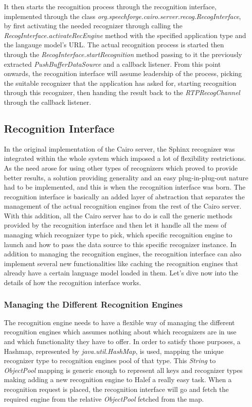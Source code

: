 It then starts the recognition process through the recognition interface, implemented through the class \textit{org.speechforge.cairo.server.recog.RecogInterface}, by first activating the needed recognizer through calling the \textit{RecogInterface.activateRecEngine} method with the specified application type and the langauge model's URL.
The actual recognition process is started then through the \textit{RecogInterface.startRecognition} method passing to it the previously extracted \textit{PushBufferDataSource} and a callback listener.
From this point onwards, the recognition interface will assume leadership of the process, picking the suitable recognizer that the application has asked for, starting recognition through this recognizer, then handing the result back to the \textit{RTPRecogChannel} through the callback listener.

\subsection{Recognition Interface}
In the original implementation of the Cairo server, the Sphinx recognizer was integrated within the whole system which imposed a lot of flexibility restrictions.
As the need arose for using other types of recognizers which proved to provide better results, a solution providing generality and an easy plug-in-plug-out nature had to be implemented, and this is when the recognition interface was born.
The recognition interface is basically an added layer of abstraction that separates the management of the actual recognition engines from the rest of the Cairo server.
With this addition, all the Cairo server has to do is call the generic methods provided by the recognition interface and then let it handle all the mess of managing which recognizer type to pick, which specific recognition engine to launch and how to pass the data source to this specific recognizer instance.
In addition to managing the recognition engines, the recognition interface can also implement several new functionalities like caching the recognition engines that already have a certain language model loaded in them.
Let's dive now into the details of how the recognition interface works.

\subsubsection{Managing the Different Recognition Engines}
The recognition engine needs to have a flexible way of managing the different recognition engines which assumes nothing about which recognizers are in use and which functionality they have to offer.
In order to satisfy those purposes, a Hashmap, represented by \textit{java.util.HashMap}, is used, mapping the unique recognizer type to recognition engines pool of that type.
This \textit{String} to \textit{ObjectPool} mapping is generic enough to represent all keys and recognizer types making adding a new recognition engine to Halef a really easy task.
When a recognition request is placed, the recognition interface will go and fetch the required engine from the relative \textit{ObjectPool} fetched from the map.


